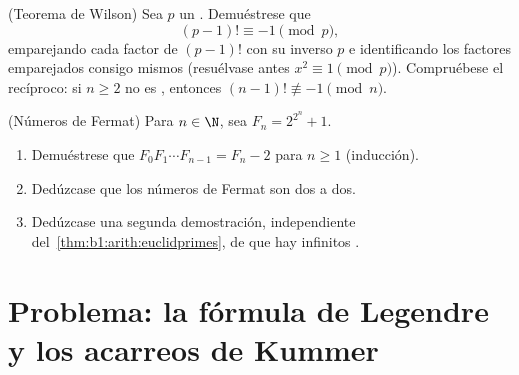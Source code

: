 \begin{exercise}[$\star\star\star$]\label{exo:b1:arith:11}
(Teorema de Wilson) Sea $p$ un . Demuéstrese que
\[
(p-1)! \equiv -1 \pmod p ,
\]
emparejando cada factor de $(p-1)!$ con su inverso  $p$ e
identificando los factores emparejados consigo mismos (resuélvase
antes $x^2 \equiv 1 \pmod p$). Compruébese el recíproco: si $n \geq 2$
no es , entonces $(n-1)! \not\equiv -1 \pmod n$.
\end{exercise}

\begin{exercise}[$\star\star\star$]\label{exo:b1:arith:12}
(Números de Fermat) Para $n \in \N$, sea $F_n = 2^{2^n} + 1$.
\begin{enumerate}
  \item Demuéstrese que $F_0 F_1 \cdots F_{n-1} = F_n - 2$ para
        $n \geq 1$ (inducción).
  \item Dedúzcase que los números de Fermat son  dos a dos.
  \item Dedúzcase una segunda demostración, independiente
        del~\cref{thm:b1:arith:euclidprimes}, de que hay infinitos
        .
\end{enumerate}
\end{exercise}

\section{Problema: la fórmula de Legendre y los acarreos de Kummer}

